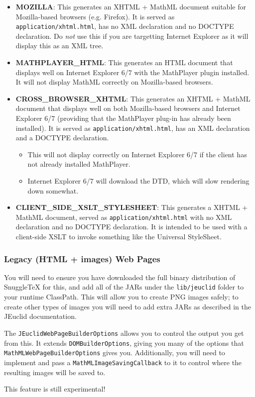 \begin{itemize}
  \item \textbf{MOZILLA}: This generates an XHTML + MathML document suitable for
    Mozilla-based browsers (e.g. Firefox). It is served as \verb|application/xhtml.html|,
    has no XML declaration and no DOCTYPE declaration. Do \emph{not} use this if you
    are targetting Internet Explorer as it will display this as an XML tree.

  \item \textbf{MATHPLAYER\_HTML}: This generates an HTML document that displays well
    on Internet Explorer 6/7 with the MathPlayer plugin installed. It will not display
    MathML correctly on Mozilla-based browsers.

  \item \textbf{CROSS\_BROWSER\_XHTML}: This generates an XHTML + MathML document that
    displays well on both Mozilla-based browsers and Internet Explorer 6/7 (providing that
    the MathPlayer plug-in has already been installed). It is served as \verb|application/xhtml.html|,
    has an XML declaration and a DOCTYPE declaration.
    \begin{itemize}
      \item This will not display correctly on Internet Explorer 6/7 if the
        client has not already installed MathPlayer.
      \item Internet Explorer 6/7 will download the DTD, which will slow rendering down
        somewhat.
    \end{itemize}

  \item \textbf{CLIENT\_SIDE\_XSLT\_STYLESHEET}: This generates a XHTML + MathML document,
    served as \verb|application/xhtml.html| with no XML declaration and no DOCTYPE declaration.
    It is intended to be used with a client-side XSLT to invoke something like the
    Universal StyleSheet.

\end{itemize}

\subsubsection*{Legacy (HTML + images) Web Pages}

You will need to ensure you have downloaded the full binary distribution of
SnuggleTeX for this, and add all of the JARs under the \verb|lib/jeuclid| folder
to your runtime ClassPath. This will allow you to create PNG images safely; to
create other types of images you will need to add extra JARs as described in
the JEuclid documentation.

The \verb|JEuclidWebPageBuilderOptions| allows you to control the output you
get from this. It extends \verb|DOMBuilderOptions|, giving you many of the
options that \verb|MathMLWebPageBuilderOptions| gives you. Additionally, you will
need to implement and pass a \verb|MathMLImageSavingCallback| to it to control where
the resulting images will be saved to.

This feature is still experimental!

